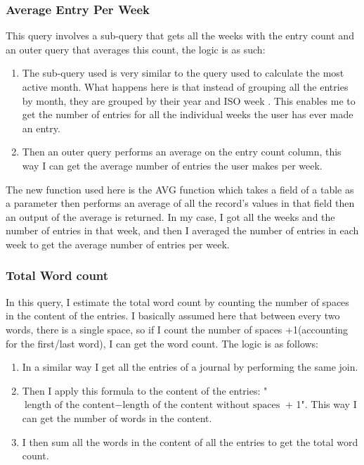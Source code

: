 \subsubsection{Average Entry Per Week}
This query involves a sub-query that gets all the weeks with the entry count and an outer query that averages this count, the logic is as such:
\begin{enumerate}
    \item The sub-query used is very similar to the query used to calculate the most active month. What happens here is that instead of grouping all the entries by month, they are grouped by their year and ISO week \cite{iso_week_date_wikipedia}. This enables me to get the number of entries for all the individual weeks the user has ever made an entry.
    \item Then an outer query performs an average on the entry count column, this way I can get the average number of entries the user makes per week.
\end{enumerate}

The new function used here is the AVG function which takes a field of a table as a parameter then performs an average of all the record's values in that field then an output of the average is returned. In my case, I got all the weeks and the number of entries in that week, and then I averaged the number of entries in each week to get the average number of entries per week.


\subsubsection{Total Word count}
In this query, I estimate the total word count by counting the number of spaces in the content of the entries. I basically assumed here that between every two words, there is a single space, so if I count the number of spaces +1(accounting for the first/last word), I can get the word count. The logic is as follows:

\begin{enumerate}
    \item In a similar way I get all the entries of a journal by performing the same join.
    \item Then I apply this formula to the content of the entries: "\( \text{length of the content} - \text{length of the content without spaces} \) + 1". This way I can get the number of words in the content.
    \item I then sum all the words in the content of all the entries to get the total word count.
\end{enumerate}


